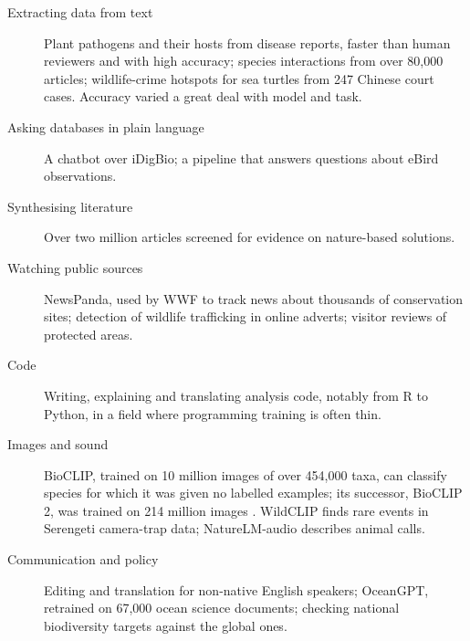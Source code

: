 \begin{description}
  \item[Extracting data from text] Plant pathogens and their hosts from disease
    reports, faster than human reviewers and with high accuracy; species
    interactions from over 80{,}000 articles; wildlife-crime hotspots for sea
    turtles from 247 Chinese court cases. Accuracy varied a great deal with
    model and task.
  \item[Asking databases in plain language] A chatbot over iDigBio; a pipeline
    that answers questions about eBird observations.
  \item[Synthesising literature] Over two million articles screened for
    evidence on nature-based solutions.
  \item[Watching public sources] NewsPanda, used by WWF to track news about
    thousands of conservation sites; detection of wildlife trafficking in online
    adverts; visitor reviews of protected areas.
  \item[Code] Writing, explaining and translating analysis code, notably from R
    to Python, in a field where programming training is often thin.
  \item[Images and sound] BioCLIP, trained on 10 million images of over 454{,}000
    taxa, can classify species for which it was given no labelled examples;
    its successor, BioCLIP 2, was trained on 214 million images
    \parencite{gu2025bioclip2}. WildCLIP finds rare events in Serengeti
    camera-trap data; NatureLM-audio describes animal calls.
  \item[Communication and policy] Editing and translation for non-native
    English speakers; OceanGPT, retrained on 67{,}000 ocean science documents;
    checking national biodiversity targets against the global ones.
\end{description}

